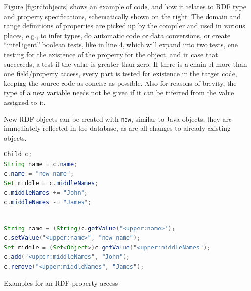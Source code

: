 Figure \ref{fig:rdfobjects} shows an example of \vonda code, and how it relates
to RDF type and property specifications, schematically shown on the right.  The
domain and range definitions of properties are picked up by the compiler and
used in various places, e.g., to infer types, do automatic code or data
conversions, or create ``intelligent'' boolean tests, like in line 4, which
will expand into two tests, one testing for the existence of the property for
the object, and in case that succeeeds, a test if the value is greater than
zero. If there is a chain of more than one field/property access, every part is
tested for existence in the target code, keeping the source code as concise as
possible. Also for reasons of brevity, the type of a new variable needs not be
given if it can be inferred from the value assigned to it.

New RDF objects can be created with \texttt{new}, similar to Java objects; they
are immediately reflected in the database, as are all changes to already
existing objects.



\begin{table}[htbp]
  \centering
\begin{small}
\begin{minipage}[t]{0.35\textwidth}
\begin{lstlisting}[language=Java]
Child c;
String name = c.name;
c.name = "new name";
Set middle = c.middleNames;
c.middleNames += "John";
c.middleNames -= "James";
\end{lstlisting}
\end{minipage}
\begin{minipage}[t]{0.6\textwidth}
\begin{lstlisting}[language=Java]

String name = (String)c.getValue("<upper:name>");
c.setValue("<upper:name>", "new name");
Set middle = (Set<Object>)c.getValue("<upper:middleNames");
c.add("<upper:middleNames", "John");
c.remove("<upper:middleNames", "James");
\end{lstlisting}
\end{minipage}
\end{small}
  \caption{Examples for an RDF property access}
  \label{tab:property-access}
\end{table}

